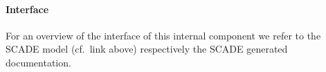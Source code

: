 \paragraph{Interface}

For an overview of the interface of this internal component we refer to the SCADE model (cf.~link above) respectively the SCADE generated documentation.

%
%
%
%
%

